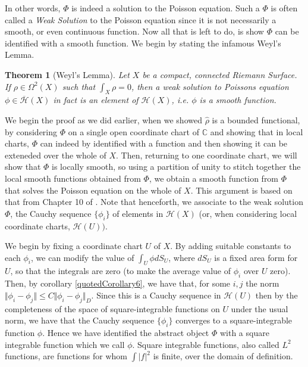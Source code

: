 \documentclass[11pt]{report}
\newtheorem{thm}{Theorem}[section]
\theoremstyle{definition}
\begin{document}
In other words, $\Phi$ is indeed a solution to the Poisson equation. Such a $\Phi$ is often called a \emph{Weak Solution} to the Poisson equation since it is not necessarily a smooth, or even continuous function.
Now all that is left to do, is show $\Phi$ can be identified with a smooth function. We begin by stating the infamous Weyl's Lemma.
\begin{thm}[Weyl's Lemma]\label{WeylsLemmaCompact}
  Let $X$ be a compact, connected Riemann Surface. If $\rho \in \Omega^2(X)$ such that $\int_X \rho = 0$, then a weak solution to Poissons equation $\phi \in \overline{\mathcal{H}}(X)$ in fact is an element of $\mathcal{H}(X)$, i.e. $\phi$ is a smooth function.
\end{thm}

We begin the proof as we did earlier, when we showed $\hat{\rho}$ is a bounded functional, by considering $\Phi$ on a single open coordinate chart of $\mathbb{C}$ and showing that in local charts, $\Phi$ can indeed by identified with a function and then showing it can be exteneded over the whole of $X$. Then, returning to one coordinate chart, we will show that $\Phi$ is locally smooth, so using a partition of unity to stitch together the local smooth functions obtained from $\Phi$, we obtain a smooth function from $\Phi$ that solves the Poisson equation on the whole of $X$. This argument is based on that from Chapter 10 of \cite{donaldson}. Note that henceforth, we associate to the weak solution $\Phi$, the Cauchy sequence $\{\phi_i\}$ of elements in $\mathcal{H}(X)$ (or, when considering local coordinate charts, $\mathcal{H}(U))$.


We begin by fixing a coordinate chart $U$ of $X$. By adding suitable constants to each $\phi_i$, we can modify the value of $\int_{U} \phi dS_{U}$, where $dS_{U}$ is a fixed area form for $U$, so that the integrals are zero (to make the average value of $\phi_i$ over $U$ zero). Then, by corollary \ref{quotedCorollary6}, we have that, for some $i,j$ the norm $\Vert \phi_i - \phi_j\Vert \leq C \Vert \phi_i - \phi_j\Vert_D$. Since this is a Cauchy sequence in $\mathcal{H}(U)$ then by the completeness of the space of square-integrable functions on $U$ under the usual norm, we have that the Cauchy sequence $\{\phi_i\}$ converges to a square-integrable function $\phi$. Hence we have identified the abstract object $\Phi$ with a square integrable function which we call $\phi$. Square integrable functions, also called $L^2$ functions, are functions for whom $\int |f|^2$ is finite, over the domain of definition.
\end{document}

